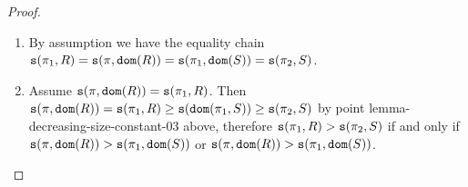 \documentclass{lmcs}
\begin{document}
\begin{proof}
\begin{enumerate}
\item
By assumption we have the equality chain 
${\tt s}(\pi_1,R)  = {\tt s}(\pi,{\tt dom}(R)) = {\tt s}(\pi_1,{\tt dom}(S)) = {\tt s}(\pi_2,S)$.

\item
Assume ${\tt s}(\pi,{\tt dom}(R)) = {\tt s}(\pi_1,R)$. Then
${\tt s}(\pi,{\tt dom}(R)) = {\tt s}(\pi_1,R) \ge {\tt s}({\tt dom}(\pi_1,S)) \ge {\tt s}(\pi_2,S)$
by point {lemma-decreasing-size-constant-03} above, therefore ${\tt s}(\pi_1,R) > {\tt s}(\pi_2,S)$
if and only if ${\tt s}(\pi,{\tt dom}(R)) > {\tt s}(\pi_1,{\tt dom}(S))$ or 
${\tt s}(\pi,{\tt dom}(R)) >{\tt s}(\pi_1,{\tt dom}(S))$.

\end{enumerate}
\end{proof}
\end{document}
